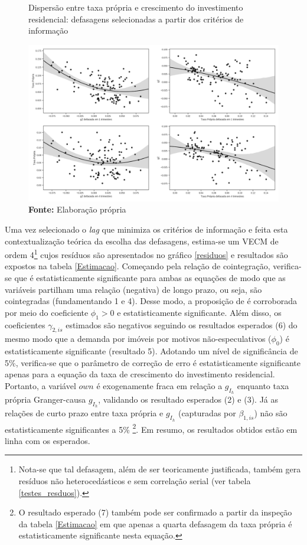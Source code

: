 \begin{figure}[htb]
	\centering
	\caption{Dispersão entre taxa própria e crescimento do investimento residencial: defasagens selecionadas a partir dos critérios de informação}
	\label{defasagens}
	\includegraphics[width=\textwidth]{../../Modelo/SeriesTemporais/figs/VEC_Defasagens.png}
	\caption*{\textbf{Fonte:} Elaboração própria}
\end{figure}



Uma vez selecionado o \textit{lag} que minimiza os critérios de informação e feita esta contextualização teórica da escolha das defasagens,  estima-se um VECM de ordem 4\footnote{Nota-se que tal defasagem, além de ser teoricamente justificada, também gera resíduos não heterocedásticos e sem correlação serial (ver tabela \ref{testes_resduos}).} cujos resíduos são apresentados no gráfico \ref{residuos} e resultados são expostos na tabela \ref{Estimacao}.
Começando pela relação de cointegração, verifica-se que é estatisticamente significante para ambas as equações de modo que as variáveis partilham uma relação (negativa) de longo prazo, ou seja, são cointegradas (fundamentando 1 e 4).
Desse modo, a proposição de \textcite{teixeira_crescimento_2015} é corroborada por meio do coeficiente $\phi_1> 0$ e estatisticamente significante.
Além disso, os coeficientes $\gamma_{2,is}$ estimados são negativos seguindo os resultados esperados (6) do mesmo modo que a demanda por imóveis por motivos não-especulativos ($\phi_0$) é estatisticamente significante (resultado 5).
Adotando um nível de significância de 5\%, verifica-se que o parâmetro de correção de erro é estatisticamente significante apenas para a equação da taxa de crescimento do investimento residencial. Portanto, a variável $own$ é exogenamente fraca em relação a $g_{I_h}$ enquanto taxa própria Granger-causa $g_{I_h}$, validando os resultado esperados (2) e (3).
Já as relações de curto prazo entre taxa própria e $g_{I_h}$ (capturadas por $\beta_{1,is}$) não são estatisticamente significantes a 5\% \footnote{O resultado esperado (7) também pode ser confirmado a partir da inspeção da tabela \ref{Estimacao} em que apenas a quarta defasagem da taxa própria é estatisticamente significante nesta equação.}. Em resumo, os resultados obtidos estão em linha com os esperados. 

